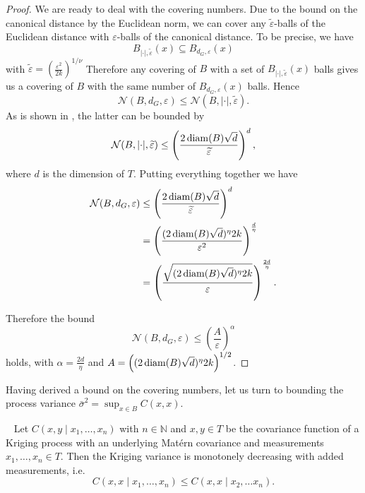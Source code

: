 \begin{proof}
We are ready to deal with the covering numbers.
Due to the bound on the canonical distance by the Euclidean norm, we can cover any $\tilde{\varepsilon}$-balls of the Euclidean distance with $\varepsilon$-balls of the canonical distance.
To be precise, we have 
\[
    B_{\lvert \cdot \rvert, \tilde{\varepsilon}}(x) \subseteq B_{d_{G},\varepsilon}(x)
\]
with \( \tilde{\varepsilon} = \left(\frac{\varepsilon^{2}}{2k}\right)^{1/\nu}  \)
Therefore any covering of $B$ with a set of \( B_{\lvert \cdot \rvert, \tilde{\varepsilon}}(x) \) balls gives us a covering of $B$ with the same number of \(  B_{d_{G},\varepsilon}(x) \) balls. Hence 
\[
    \mathcal{N}(B,d_{G},\varepsilon) \leq \mathcal{N}(B,\lvert \cdot \rvert,\tilde{\varepsilon}).
\]
As is shown in \cite[Cor. 4.2.13]{vershynin2020high}, the latter can be bounded by 
\[
    \mathcal{N}(B,\lvert \cdot \rvert,\widetilde{\varepsilon}) \leq \left( \frac{2 \operatorname{diam}(B) \sqrt{d}}{\widetilde{\varepsilon}} \right)^{d},
\]
where $d$ is the dimension of $T$.
Putting everything together we have
\begin{align*}
    \mathcal{N}(B,d_{G},\varepsilon) &\leq \left( \frac{2 \operatorname{diam}(B) \sqrt{d}}{\widetilde{\varepsilon}} \right)^{d}\\
    &= \left( \frac{(2 \operatorname{diam}(B) \sqrt{d})^{\eta} 2k}{\varepsilon^2} \right)^{\frac{d}{\eta}}\\
    &= \left( \frac{ \sqrt{(2 \operatorname{diam}(B) \sqrt{d})^{\eta} 2k }}{\varepsilon} \right)^{\frac{2d}{\eta}}.
\end{align*}

Therefore the bound
\[
    \mathcal{N}(B,d_{G},\varepsilon) \leq (\frac{A}{\varepsilon})^{\alpha}
\]
holds, with $\alpha = \frac{2d}{\eta}$ and $A = \left((2 \operatorname{diam}(B) \sqrt{d})^{\eta} 2k\right)^{1/2}$.
%
%
%
\end{proof}
Having derived a bound on the covering numbers, let us turn to bounding the process variance \( \bar{\sigma}^2 = \sup_{x \in B} C(x,x) \).
\begin{lemma}
    ~\label{lemma:kriging_variance_monotone}
    Let $C(x,y \mid x_{1}, \dots, x_{n})$ with $n \in \mathbb{N}$ and $x,y \in T$ be the covariance function of a Kriging process with an underlying Matérn covariance and measurements $x_{1}, \dots, x_{n} \in T$.
    Then the Kriging variance is monotonely decreasing with added measurements, i.e.
    \[
        C(x,x \mid x_{1}, \dots, x_{n}) \leq C(x,x \mid x_{2}, \dots x_{n}).
    \]
\end{lemma}
